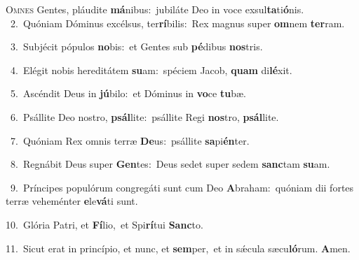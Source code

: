 \lettrine{\initial\textcolor{\initialcolor}{O}}{mnes} Gentes, pláudite \textbf{má}\-nibus:~\star jubiláte Deo in voce exsul\-\textbf{ta}\-ti\-\textbf{ó}\-nis.\\
{\numbfont\textcolor{\numbcolor}{~2.}}~Quóniam Dóminus excélsus, ter\-\textbf{rí}\-bilis:~\star Rex magnus super \textbf{om}\-nem \textbf{ter}\-ram.\par
{\numbfont\textcolor{\numbcolor}{~3.}}~Subjécit pópulos \textbf{no}\-bis:~\star et Gentes sub \textbf{pé}\-dibus \textbf{nos}\-tris.\par
{\numbfont\textcolor{\numbcolor}{~4.}}~Elégit nobis hereditátem \textbf{su}\-am:~\star spéciem Jacob, \textbf{quam} di\-\textbf{lé}\-xit.\par
{\numbfont\textcolor{\numbcolor}{~5.}}~Ascéndit Deus in \textbf{jú}\-bilo:~\star et Dóminus in \textbf{vo}\-ce \textbf{tu}\-bæ.\par
{\numbfont\textcolor{\numbcolor}{~6.}}~Psállite Deo nostro, \textbf{psál}\-lite:~\star psállite Regi \textbf{nos}\-tro, \textbf{psál}\-lite.\par
{\numbfont\textcolor{\numbcolor}{~7.}}~Quóniam Rex omnis terræ \textbf{De}\-us:~\star psállite \textbf{sa}\-pi\-\textbf{én}\-ter.\par
{\numbfont\textcolor{\numbcolor}{~8.}}~Regnábit Deus super \textbf{Gen}\-tes:~\star Deus sedet super sedem \textbf{sanc}\-tam \textbf{su}\-am.\par
{\numbfont\textcolor{\numbcolor}{~9.}}~Príncipes populórum congregáti sunt cum Deo \textbf{A}\-braham:~\star quóniam dii fortes terræ veheménter \textbf{e}\-le\-\textbf{vá}\-ti sunt.\par
{\numbfont\textcolor{\numbcolor}{10.}}~Glória Patri, et \textbf{Fí}\-lio,~\star et Spi\-\textbf{rí}\-tui \textbf{Sanc}\-to.\par
{\numbfont\textcolor{\numbcolor}{11.}}~Sicut erat in princípio, et nunc, et \textbf{sem}\-per,~\star et in sǽcula sæcu\-\textbf{ló}\-rum. \textbf{A}\-men.\par
